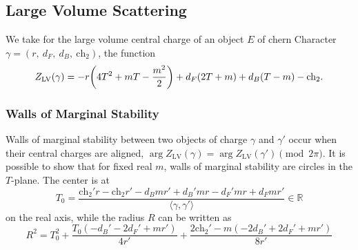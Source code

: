 \documentclass[11pt, a4paper]{article}
\newcommand{\ch}{\mathrm{ch}}
\newcommand{\LV}{\mathrm{LV}}
\numberwithin{equation}{section}
\begin{document}
\subsection{Large Volume Scattering}

We take for the large volume central charge of an object $E$ of chern Character $\gamma = (r, \ d_F, \ d_B, \ \ch_2)$, the function
\begin{equation}\label{eqn:LVCentralCharge}
  Z_\LV(\gamma) = -r \qty(4 T^2 + m T - \frac{m^2}{2}) + d_F (2T+m) + d_B(T-m) - \ch_2.
\end{equation}

\subsubsection{Walls of Marginal Stability}
Walls of marginal stability between two objects of charge $\gamma$ and $\gamma'$ occur when their central charges are aligned, $\arg Z_\LV(\gamma) = \arg Z_\LV(\gamma') \pmod{2\pi}$. It is possible to show that for fixed real $m$, walls of marginal stability are circles in the $T$-plane. The center is at
\begin{equation}
  T_0 = \frac{\ch_2' r-\ch_2 r'-d_B m r'+d_B' m r-d_F' m r+d_F m r'}{\langle \gamma, \gamma' \rangle} \in \mathbb{R}
\end{equation}
on the real axis, while the radius $R$ can be written as
\begin{equation}
  R^2 = T_0^2 + \frac{T_0 (-d_B'-2 d_F'+m r')}{4 r'} + \frac{2 \ch_2'-m (-2 d_B'+2 d_F'+m r')}{8 r'}
\end{equation}
\end{document}
